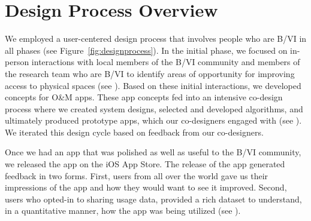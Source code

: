 \documentclass[chi_draft]{sigchi}
\newcommand{\BVI}{B/VI\xspace}
\newcommand{\OM}{O\&M\xspace}
\begin{document}

\section{Design Process Overview}

We employed a user-centered design process that involves people who are \BVI in all phases (see Figure~\ref{fig:designprocess}).  In the initial phase, we focused on in-person interactions with local members of the \BVI community and members of the research team who are \BVI to identify areas of opportunity for improving access to physical spaces (see \emph{}).  Based on these initial interactions, we developed concepts for \OM apps.  These app concepts fed into an intensive co-design process where we created system designs, selected and developed algorithms, and ultimately produced prototype apps, which our co-designers engaged with (see \emph{}).  We iterated this design cycle based on feedback from our co-designers.

Once we had an app that was polished as well as useful to the \BVI community, we released the app on the iOS App Store.  The release of the app generated feedback in two forms.  First, users from all over the world gave us their impressions of the app and how they would want to see it improved.  Second, users who opted-in to sharing usage data, provided a rich dataset to understand, in a quantitative manner, how the app was being utilized (see \emph{}).
\end{document}
